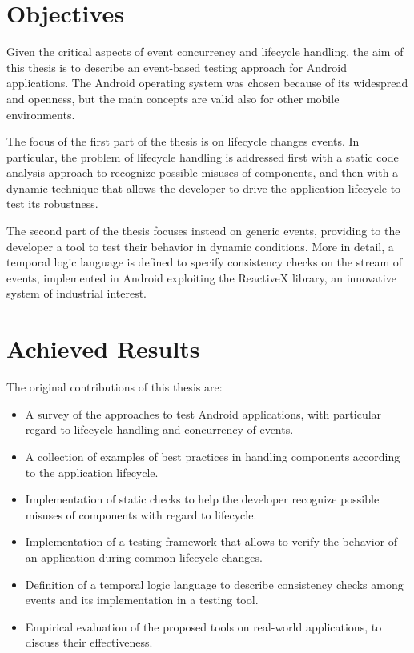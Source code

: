 \documentclass[11pt,a4paper,notitlepage]{article}
\begin{document}
\section{Objectives}
Given the critical aspects of event concurrency and lifecycle handling, the aim of this thesis is to describe an event-based testing approach for Android applications. The Android operating system was chosen because of its widespread and openness, but the main concepts are valid also for other mobile environments.

The focus of the first part of the thesis is on lifecycle changes events. In particular, the problem of lifecycle handling is addressed first with a static code analysis approach to recognize possible misuses of components, and then with a dynamic technique that allows the developer to drive the application lifecycle to test its robustness.

The second part of the thesis focuses instead on generic events, providing to the developer a tool to test their behavior in dynamic conditions. More in detail, a temporal logic language is defined to specify consistency checks on the stream of events, implemented in Android exploiting the ReactiveX library, an innovative system of industrial interest.

\section{Achieved Results}
The original contributions of this thesis are:
\begin{itemize}
	\item A survey of the approaches to test Android applications, with particular regard to lifecycle handling and concurrency of events.
	\item A collection of examples of best practices in handling components according to the application lifecycle.
	\item Implementation of static checks to help the developer recognize possible misuses of components with regard to lifecycle.
	\item Implementation of a testing framework that allows to verify the behavior of an application during common lifecycle changes.
	\item Definition of a temporal logic language to describe consistency checks among events and its implementation in a testing tool.
	\item Empirical evaluation of the proposed tools on real-world applications, to discuss their effectiveness.
\end{itemize}
\end{document}
